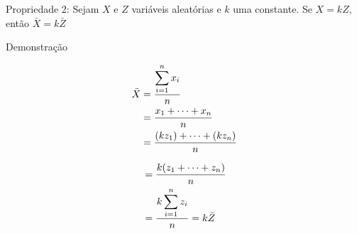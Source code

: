 \documentclass[14pt,aspectratio=1610]{beamer}
\begin{document}
\begin{frame}{}
\frametitle{}
\begin{block}{Propriedade 2:}
\justifying
Sejam $X$ e $Z$ variáveis aleatórias e $k$ uma constante. Se $X=kZ,$ então $\bar{X}=k\bar{Z}$
\end{block}
\pause
\begin{block}{Demonstração}
\begin{minipage}{0.4\textwidth}
\begin{align*}
\bar{X}&=\dfrac{{\displaystyle \sum_{i=1}^{n}x_{i}}}{n}\\ 
\vspace{0.1cm}
       &=\dfrac{x_{1}+\cdots+x_{n}}{n}\\ \vspace{0.1cm}
       &=\dfrac{(kz_{1})+\cdots+(kz_{n})}{n}\\
\end{align*}
\end{minipage}\pause\hfill
\begin{minipage}{0.4\textwidth}
\begin{align*}
&=\dfrac{k(z_{1}+\cdots+z_{n})}{n}\\ \vspace{0.1cm}
&=\dfrac{{\displaystyle k\sum_{i=1}^{n}z_{i}}}{n}=k\bar{Z}
\end{align*}
\end{minipage}
\end{block}
\end{frame}
\end{document}
